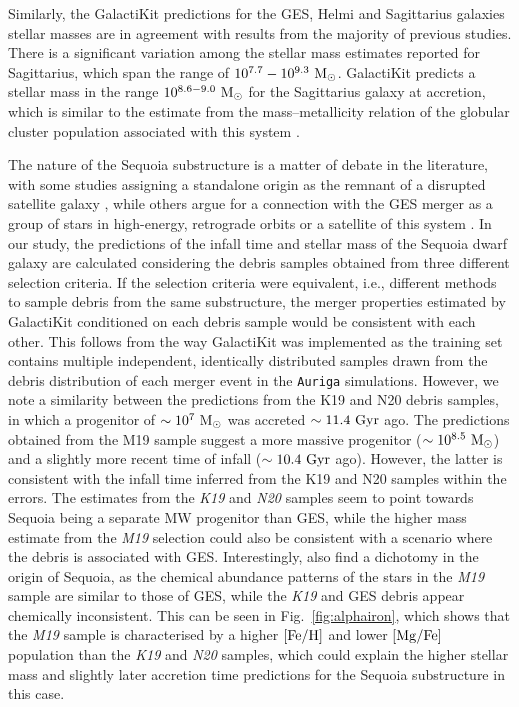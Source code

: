 Similarly, the GalactiKit predictions for the GES, Helmi and Sagittarius galaxies stellar masses are in agreement with results from the majority of previous studies. There is a significant variation among the stellar mass estimates reported for Sagittarius, which span the range of $10^{7.7}-10^{9.3}~\rm{M}_{\odot}$. GalactiKit predicts a stellar mass in the range $10^{8.6-9.0}~\rm{M}_{\odot}$ for the Sagittarius galaxy at accretion, which is similar to the estimate from the mass--metallicity relation of the globular cluster population associated with this system \citep{Kruijssen2020}. 


The nature of the Sequoia substructure \citep{Myeong2019,Koppelman2019} is a matter of debate in the literature, with some studies assigning a standalone origin as the remnant of a disrupted satellite galaxy \citep{Myeong2019,Matsuno2019,GarciaBethencourt2023,Ceccarelli2024}, while others argue for a connection with the GES merger as a group of stars in high-energy, retrograde orbits \citep{Koppelman2019,Koppelman2020,Amarante2022} or a satellite of this system \citep{Naidu2021}. In our study, the predictions of the infall time and stellar mass of the Sequoia dwarf galaxy are calculated considering the debris samples obtained from three different selection criteria. If the selection criteria were equivalent, i.e., different methods to sample debris from the same substructure, the merger properties estimated by GalactiKit conditioned on each debris sample would be consistent with each other. This follows from the way GalactiKit was implemented as the training set contains multiple independent, identically distributed samples drawn from the debris distribution of each merger event in the \texttt{Auriga} simulations. However, we note a similarity between the predictions from the K19 and N20 debris samples, in which a progenitor of $\sim10^{7}~\rm{M}_{\odot}$ was accreted $\sim11.4~\rm{Gyr}$ ago. The predictions obtained from the M19 sample suggest a more massive progenitor ($\sim10^{8.5}~\rm{M}_{\odot}$) and a slightly more recent time of infall ($\sim10.4~\rm{Gyr}$ ago). However, the latter is consistent with the infall time inferred from the K19 and N20 samples within the errors. The estimates from the \textit{K19} and \textit{N20} samples seem to point towards Sequoia being a separate MW progenitor than GES, while the higher mass estimate from the \textit{M19} selection could also be consistent with a scenario where the debris is associated with GES. Interestingly, \citet{Horta2023} also find a dichotomy in the origin of Sequoia, as the chemical abundance patterns of the stars in the \textit{M19} sample are similar to those of GES, while the \textit{K19} and GES debris appear chemically inconsistent. This can be seen in Fig.~\ref{fig:alphairon}, which shows that the {\it M19} sample is characterised by a higher $\rm{[Fe/H]}$ and lower $\rm{[Mg/Fe]}$ population than the {\it K19} and {\it N20} samples, which could explain the higher stellar mass and slightly later accretion time predictions for the Sequoia substructure in this case. 


